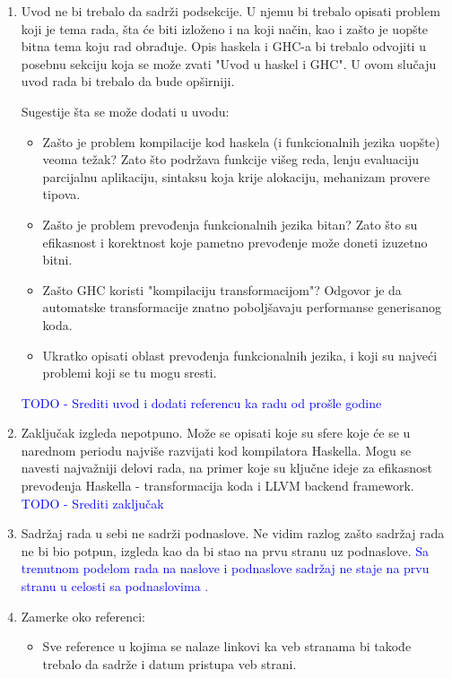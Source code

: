 \documentclass[a4paper]{report}
\newcommand{\odgovor}[1]{\textcolor{blue}{#1}}
\begin{document}
\begin{enumerate}  

	\item Uvod ne bi trebalo da sadrži podsekcije. U njemu bi trebalo opisati problem koji je tema rada, šta će biti izloženo i na koji način, kao i zašto je uopšte bitna tema koju rad obrađuje. Opis haskela i GHC-a bi trebalo odvojiti u posebnu sekciju koja se može zvati "Uvod u haskel i GHC". U ovom slučaju uvod rada bi trebalo da bude opširniji. 
	
	Sugestije šta se može dodati u uvodu:
	\begin{itemize}
		\item Zašto je problem kompilacije kod haskela (i funkcionalnih jezika uopšte) veoma težak? Zato što podržava funkcije višeg reda, lenju evaluaciju parcijalnu aplikaciju, sintaksu koja krije alokaciju, mehanizam provere tipova.
		
		\item Zašto je problem prevođenja funkcionalnih jezika bitan? Zato što su efikasnost i korektnost koje pametno prevođenje može doneti izuzetno bitni. 
		
		\item Zašto GHC koristi "kompilaciju transformacijom"? Odgovor je da automatske transformacije znatno poboljšavaju performanse generisanog koda.
		
		\item Ukratko opisati oblast prevođenja funkcionalnih jezika, i koji su najveći problemi koji se tu mogu sresti.
	\end{itemize}
	\odgovor{TODO - Srediti uvod i dodati referencu ka radu od prošle godine}
	

	\item Zaključak izgleda nepotpuno. Može se opisati koje su sfere koje će se u narednom periodu najviše razvijati kod kompilatora Haskella. Mogu se navesti najvažniji delovi rada, na primer koje su ključne ideje za efikasnost prevođenja Haskella - transformacija koda i LLVM backend framework.
	\odgovor{TODO - Srediti zaključak}
	
	
	\item Sadržaj rada u sebi ne sadrži podnaslove. Ne vidim razlog zašto sadržaj rada ne bi bio potpun, izgleda kao da bi stao na prvu stranu uz podnaslove.
	\odgovor{Sa trenutnom podelom rada na naslove i podnaslove sadržaj ne staje na prvu stranu u celosti sa podnaslovima .}
	
	\item Zamerke oko referenci:
		\begin{itemize}
			\item Sve reference u kojima se nalaze linkovi ka veb stranama bi takođe trebalo da sadrže i datum pristupa veb strani.
			

\end{itemize}
\end{enumerate}
\end{document}
